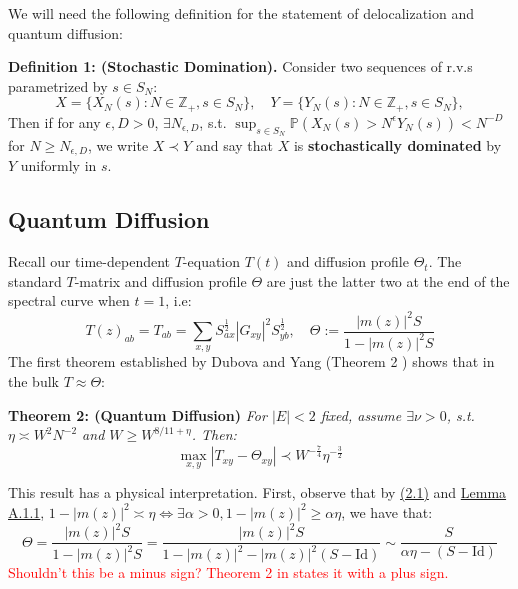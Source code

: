 \documentclass[11pt]{article}
\newenvironment{boxtheorem}[1]
  {\begin{mdframed}\noindent\textbf{#1}\itshape\space}
  {\end{mdframed}}
\newenvironment{boxt}[1]
  {\begin{mdframed}\noindent\textbf{#1}\normalfont\space}
  {\end{mdframed}}
\begin{document}
We will need the following definition for the statement of delocalization and quantum diffusion:
\begin{boxt}{Definition 1: (Stochastic Domination).}
\noindent Consider two sequences of r.v.s parametrized by $s\in S_N$:\vspace{-0.25 cm}
$$X = \{X_N(s): N\in \mathbb{Z}_+, s\in S_N\}, \quad Y = \{Y_N(s): N\in \mathbb{Z}_+, s\in S_N\},$$
Then if for any $\epsilon, D>0$, $\exists N_{\epsilon, D}$, s.t. $\sup_{s\in S_N}\mathbb{P}\left(X_N(s)>N^\epsilon Y_N(s)\right)<N^{-D}$ for $N\geq N_{\epsilon, D}$, 
we write $X \prec Y$ and say that $X$ is \textbf{stochastically dominated} by $Y$ uniformly in $s$. 
\end{boxt}

\subsection{Quantum Diffusion}
\label{diffusion}
Recall our time-dependent $T$-equation $T(t)$ and diffusion profile $\Theta_t$. The standard $T$-matrix and diffusion profile $\Theta$ are just the latter two at the end of the spectral curve when $t=1$, i.e: $$T(z)_{ab} = T_{ab} = \sum_{x,y}S_{ax}^{\frac{1}{2}} |G_{xy}|^2S_{yb}^{\frac{1}{2}}, \quad \Theta := \frac{|m(z)|^2S}{1-|m(z)|^2S}$$
The first theorem established by Dubova and Yang (Theorem 2 \cite{bandSDE}) shows that in the bulk $T\approx \Theta$:
\begin{boxtheorem}{Theorem 2: (Quantum Diffusion)}
For $|E|<2$ fixed, assume $\exists \nu>0$, s.t. $\eta \asymp W^2 N^{-2}$ and $W\geq W^{8/11+\eta}$. Then: $$\max_{x, y}|T_{xy}-\Theta_{xy}|\prec W^{-\frac{7}{4}}\eta^{-\frac{3}{2}}$$
\end{boxtheorem}
This result has a physical interpretation. First, observe
that by \hyperref[2.1]{(2.1)} and  \hyperref[lemma-a11]{Lemma A.1.1}, $1-|m(z)|^2\asymp \eta\Leftrightarrow \exists \alpha>0, 1-|m(z)|^2\geq \alpha\eta$, we have that: 
 $$\Theta =\frac{|m(z)|^2S}{1-|m(z)|^2S} = \frac{|m(z)|^2S}{1-|m(z)|^2-|m(z)|^2(S-\text{Id})}\sim \frac{S}{\alpha\eta-(S-\text{Id})}$$
\textcolor{red}{Shouldn't this be a minus sign? Theorem 2 in \cite{bandSDE} states it with a plus sign.}
\end{document}
